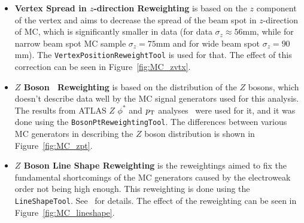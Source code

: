 \begin{itemize}
\item \textbf{Vertex Spread in $z$-direction Reweighting} is based on the $z$ component of the vertex and aims to decrease the spread of the beam spot in $z$-direction of MC, which is significantly smaller in data (for data $\sigma_z \approx 56$mm, while for narrow beam spot MC sample $\sigma_z = 75$mm and for wide beam spot $\sigma_z = 90$mm). The \texttt{VertexPositionReweightTool} is used for that. The effect of this correction can be seen in Figure~\ref{fig:MC_zvtx}.
\item \textbf{$Z$ Boson \pt\ Reweighting} is based on the \pt distribution of the $Z$ bosons, which doesn't describe data well by the MC signal generators used for this analysis. The results from ATLAS $Z$ $\phi^*$ and $p_{\mathrm{T}}$ analyses~\cite{lib:Zphistar} were used for it, and it was done using the \texttt{BosonPtReweightingTool}. The differences between various MC generators in describing the $Z$ boson \pt distribution is shown in Figure~\ref{fig:MC_zpt}.
\item \textbf{$Z$ Boson Line Shape Reweighting} is the reweightings aimed to fix the fundamental shortcomings of the MC generators caused by the electroweak order not being high enough. This reweighting is done using the \texttt{LineShapeTool}. See~\cite{lib:lineshape} for details. The effect of the reweighting can be seen in Figure~\ref{fig:MC_lineshape}.
\end{itemize}

